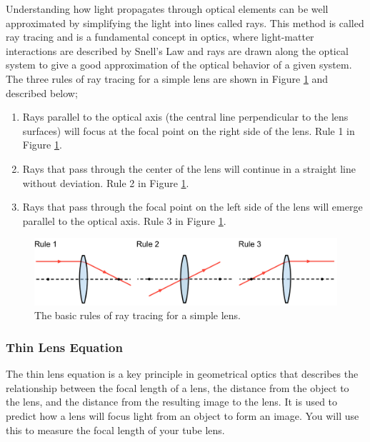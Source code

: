 \documentclass[12pt,a4paper,twoside]{article}
\begin{document}
Understanding how light propagates through optical elements can be well approximated by simplifying the light into lines called rays. This method is called ray tracing and is a fundamental concept in optics, where light-matter interactions are described by Snell's Law and rays are drawn along the optical system to give a good approximation of the optical behavior of a given system. The three rules of ray tracing for a simple lens are shown in Figure \ref{fig:ray-tracing} and described below;

\begin{enumerate}
    \item Rays parallel to the optical axis (the central line perpendicular to the lens surfaces) will focus at the focal point on the right side of the lens. Rule 1 in Figure \ref{fig:ray-tracing}.
    \item Rays that pass through the center of the lens will continue in a straight line without deviation. Rule 2 in Figure \ref{fig:ray-tracing}.
    \item Rays that pass through the focal point on the left side of the lens will emerge parallel to the optical axis. Rule 3 in Figure \ref{fig:ray-tracing}.
\end{enumerate}

\begin{figure}
    \centering
    \includegraphics[width=1\linewidth]{Ray Tracing Rules.pdf}
    \caption{The basic rules of ray tracing for a simple lens.}
    \label{fig:ray-tracing}
 \end{figure}

\subsubsection{Thin Lens Equation}

The thin lens equation is a key principle in geometrical optics that describes the relationship between the focal length of a lens, the distance from the object to the lens, and the distance from the resulting image to the lens. It is used to predict how a lens will focus light from an object to form an image. You will use this to measure the focal length of your tube lens.
\end{document}
